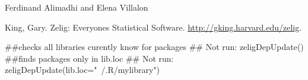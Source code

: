 \begin{Author}\relax
Ferdinand Alimadhi and Elena Villalon
\end{Author}
\begin{References}\relax
King, Gary. Zelig: Everyones Statistical Software. 
\url{http://gking.harvard.edu/zelig}.
\end{References}
\begin{SeeAlso}\relax
{}
\end{SeeAlso}
\begin{Examples}
\begin{ExampleCode}
##checks all libraries curently know for packages
## Not run: zeligDepUpdate()
##finds packages only in lib.loc
## Not run: zeligDepUpdate(lib.loc="~/.R/mylibrary")
\end{ExampleCode}
\end{Examples}



